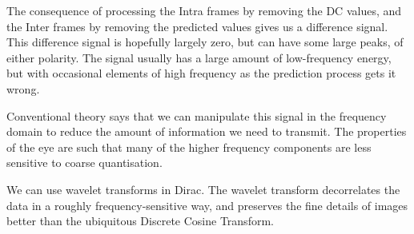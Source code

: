 The consequence of processing the Intra frames by removing the DC
values, and the Inter frames by removing the predicted values gives us a
difference signal. This difference signal is hopefully largely zero, but
can have some large peaks, of either polarity. The signal usually has a
large amount of low-frequency energy, but with occasional elements of
high frequency as the prediction process gets it wrong.

Conventional theory says that we can manipulate this signal in the
frequency domain to reduce the amount of information we need to
transmit. The properties of the eye are such that many of the higher
frequency components are less sensitive to coarse quantisation.

We can use wavelet transforms in Dirac. The wavelet transform
decorrelates the data in a roughly frequency-sensitive way, and
preserves the fine details of images better than the ubiquitous Discrete
Cosine Transform.
